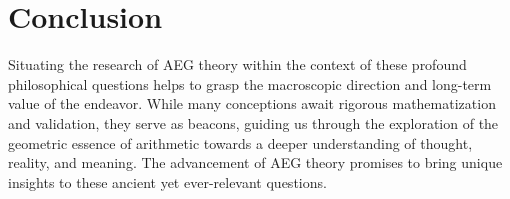 \documentclass{article}
\begin{document}
\section{Conclusion}
Situating the research of AEG theory within the context of these profound philosophical questions helps to grasp the macroscopic direction and long-term value of the endeavor. While many conceptions await rigorous mathematization and validation, they serve as beacons, guiding us through the exploration of the geometric essence of arithmetic towards a deeper understanding of thought, reality, and meaning. The advancement of AEG theory promises to bring unique insights to these ancient yet ever-relevant questions.
\end{document}
